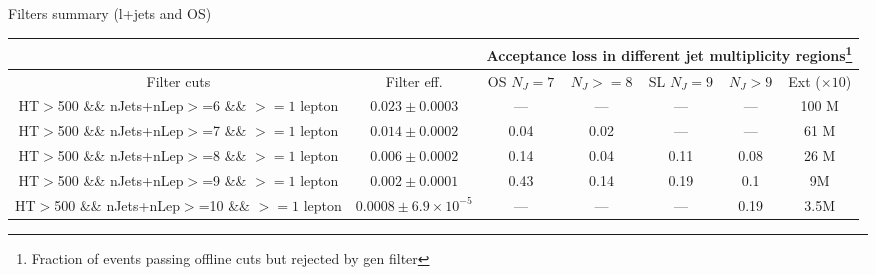 \documentclass{beamer}
\begin{document}
\begin{frame}{Filters summary  (l+jets and OS)}
\begin{center}
{\tiny \begin{tabular}{|c|c|c|c|c|c|c|}
            \cline{1-7}
             & & \multicolumn{5}{|c|}{Acceptance loss in different jet multiplicity regions\footnote{Fraction of events passing offline cuts but rejected by gen filter}}\\
            \cline{1-7}
\hline Filter cuts & Filter eff. & OS $N_J=7$& $N_J>=8$ & SL $N_J=9$& $N_J>9$& Ext ($\times 10$) \\ 
\hline \thead{{\tiny HT$>$500} \\ {\tiny \&\&  nJets+nLep$>$=6} \\ {\tiny \&\& $>=1$ lepton}} & $0.023 \pm 0.0003$  & --- & --- & --- & --- & 100 M\\
\hline \thead{{\tiny HT$>$500} \\ {\tiny \&\&  nJets+nLep$>$=7} \\ {\tiny \&\& $>=1$ lepton}} & $0.014 \pm 0.0002$  & 0.04 & 0.02 & --- & --- & 61 M\\
\hline \thead{{\tiny HT$>$500} \\{\tiny \&\& nJets+nLep$>$=8} \\ {\tiny \&\& $>=1$ lepton}} & $0.006 \pm 0.0002$  & 0.14 & 0.04 & 0.11 & 0.08 & 26 M\\ 
\hline \thead{{\tiny HT$>$500} \\ {\tiny \&\& nJets+nLep$>$=9} \\ {\tiny \&\& $>=1$ lepton}} & $0.002 \pm 0.0001$   & 0.43 & 0.14 & 0.19 & 0.1 & 9M\\ 
\hline \thead{{\tiny HT$>$500} \\ {\tiny \&\& nJets+nLep$>$=10} \\ {\tiny \&\& $>=1$ lepton}} & $0.0008 \pm 6.9\times 10^{-5}$   & --- & --- & --- & 0.19 & 3.5M\\
\hline 
\end{tabular} }
\end{center}
\end{frame}
\end{document}
